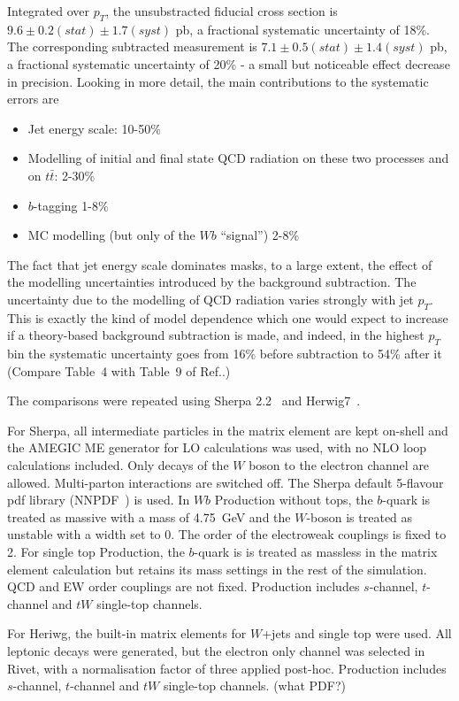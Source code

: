 \documentclass[11pt]{cernrep}
\begin{document}
Integrated over $p_T$, the unsubstracted fiducial cross section is
$9.6 \pm 0.2 (stat) \pm 1.7 (syst)$ pb, a fractional systematic uncertainty of 18\%.
The corresponding subtracted measurement is 
$7.1 \pm 0.5 (stat) \pm 1.4 (syst)$ pb, a fractional systematic uncertainty of 20\%
- a small but noticeable effect decrease in precision. Looking in more detail, the main contributions 
to the systematic errors are
\begin{itemize}
\item Jet energy scale: 10-50\%
\item Modelling of initial and final state QCD radiation on these two processes and on $t\bar{t}$: 2-30\%
\item $b$-tagging 1-8\%
\item MC modelling (but only of the $Wb$ “signal”) 2-8\%
\end{itemize}
The fact that jet energy scale dominates masks, to a large extent, the effect of the modelling uncertainties introduced by
the background subtraction.
The uncertainty due to the modelling of QCD radiation varies strongly with jet $p_T$. 
This is exactly the kind of model dependence which one would expect to increase if a theory-based background
subtraction is made, and indeed, in the highest $p_T$ bin the systematic uncertainty goes from 16\% before subtraction 
to 54\% after it (Compare Table~4 with Table~9 of Ref.\cite{Aad:2013vka}.) 

The comparisons were repeated using Sherpa 2.2~\cite{Gleisberg:2008ta} and Herwig7~\cite{Bellm:2015jjp}. 

For Sherpa, all intermediate particles in the matrix element are kept on-shell and the AMEGIC 
ME generator for LO calculations was used, with no NLO loop calculations included. Only decays of the $W$ boson to the 
electron channel are allowed. Multi-parton interactions are switched off. 
The Sherpa default 5-flavour pdf library (NNPDF~\cite{Ball:2014uwa}) is used. In $Wb$ Production without tops, the $b$-quark is treated as massive with a mass of 4.75~GeV and the $W$-boson is treated as unstable with a width set to 0. The order of the electroweak couplings is fixed to 2. 
For single top Production, the $b$-quark is is treated as massless in the matrix element calculation but retains its mass settings in the rest of 
the simulation. QCD and EW order couplings are not fixed. Production includes $s$-channel, $t$-channel and $tW$ single-top channels.

For Heriwg, the built-in matrix elements for $W$+jets and single top were used. All leptonic decays were generated, but the electron only channel
was selected in Rivet, with a normalisation factor of three applied post-hoc. Production includes $s$-channel, $t$-channel and $tW$ single-top channels. (what PDF?)
\end{document}
